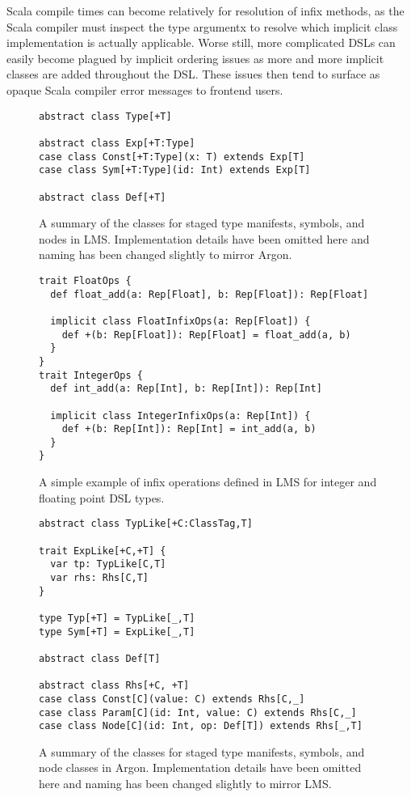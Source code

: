 Scala compile times can become relatively for resolution of infix methods,
as the Scala compiler must inspect the type argumentx
to resolve which implicit class implementation is actually applicable.
Worse still, more complicated DSLs can easily become plagued by implicit
ordering issues as more and more implicit classes are added throughout the
DSL. These issues then tend to surface as opaque
Scala compiler error messages to frontend users.

\begin{figure}
\begin{lstlisting}[language=ScalaDSL]
abstract class Type[+T]

abstract class Exp[+T:Type]
case class Const[+T:Type](x: T) extends Exp[T]
case class Sym[+T:Type](id: Int) extends Exp[T]

abstract class Def[+T]
\end{lstlisting}
\caption{A summary of the classes for staged type manifests, symbols, and nodes in LMS. Implementation details have been omitted here and naming has been changed slightly to mirror Argon.}
\label{fig:lms-ir}
\end{figure}

\begin{figure}
\begin{lstlisting}[language=ScalaDSL]
trait FloatOps {
  def float_add(a: Rep[Float], b: Rep[Float]): Rep[Float]

  implicit class FloatInfixOps(a: Rep[Float]) {
    def +(b: Rep[Float]): Rep[Float] = float_add(a, b)
  }
}
trait IntegerOps {
  def int_add(a: Rep[Int], b: Rep[Int]): Rep[Int]

  implicit class IntegerInfixOps(a: Rep[Int]) {
    def +(b: Rep[Int]): Rep[Int] = int_add(a, b)
  }
}
\end{lstlisting}
\caption{A simple example of infix operations defined in LMS for integer and floating point DSL types.}
\label{fig:lms-ir-example}
\end{figure}

\begin{figure}
\begin{lstlisting}[language=ScalaDSL]
abstract class TypLike[+C:ClassTag,T]

trait ExpLike[+C,+T] {
  var tp: TypLike[C,T]
  var rhs: Rhs[C,T]
}

type Typ[+T] = TypLike[_,T]
type Sym[+T] = ExpLike[_,T]

abstract class Def[T]

abstract class Rhs[+C, +T]
case class Const[C](value: C) extends Rhs[C,_]
case class Param[C](id: Int, value: C) extends Rhs[C,_]
case class Node[C](id: Int, op: Def[T]) extends Rhs[_,T]
\end{lstlisting}
\caption{A summary of the classes for staged type manifests, symbols, and node classes in Argon. Implementation details have been omitted here and naming has been changed slightly to mirror LMS.}
\label{fig:argon-ir}
\end{figure}

